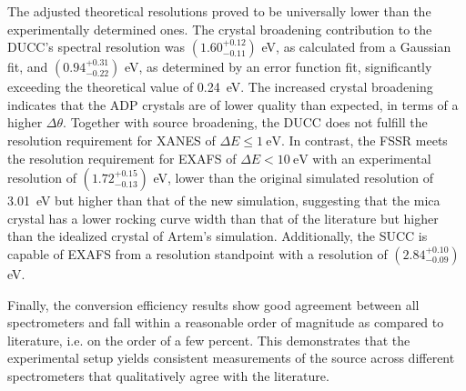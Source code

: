 The adjusted theoretical resolutions proved to be universally lower than the experimentally determined ones. The crystal broadening contribution to the DUCC's spectral resolution was $\left(1.60^{+0.12}_{-0.11}\right)$ eV, as calculated from a Gaussian fit, and $\left(0.94^{+0.31}_{-0.22}\right)$ eV, as determined by an error function fit, significantly exceeding the theoretical value of \SI{0.24}{\electronvolt}. The increased crystal broadening indicates that the ADP crystals are of lower quality than expected, in terms of a higher $\Delta \theta$. Together with source broadening, the DUCC does not fulfill the resolution requirement for XANES of $\Delta E\leq\SI{1}{\electronvolt}$. In contrast, the FSSR meets the resolution requirement for EXAFS of $\Delta E <\SI{10}{\electronvolt}$ with an experimental resolution of $\left(1.72^{+0.15}_{-0.13}\right)$ eV, lower than the original simulated resolution of \SI{3.01}{\electronvolt} but higher than that of the new simulation, suggesting that the mica crystal has a lower rocking curve width than that of the literature but higher than the idealized crystal of Artem's simulation. Additionally, the SUCC is capable of EXAFS from a resolution standpoint with a resolution of $\left(2.84^{+0.10}_{-0.09}\right)$ eV.

Finally, the conversion efficiency results show good agreement between all spectrometers and fall within a reasonable order of magnitude as compared to literature, i.e. on the order of a few percent. This demonstrates that the experimental setup yields consistent measurements of the source across different spectrometers that qualitatively agree with the literature.

